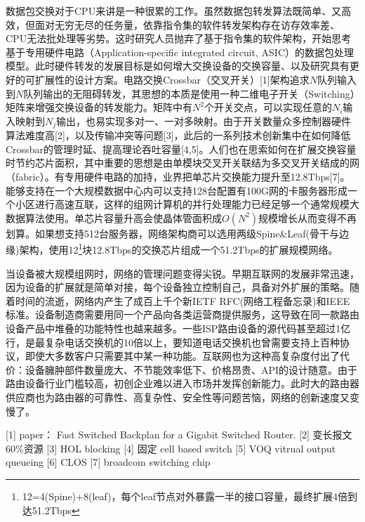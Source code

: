 
数据包交换对于CPU来讲是一种很累的工作。虽然数据包转发算法既简单、又高效，但面对无穷无尽的任务量，依靠指令集的软件转发架构存在访存效率差、CPU无法批处理等劣势。这时研究人员抛弃了基于指令集的软件架构，开始思考基于专用硬件电路（Application-specific integrated circuit, ASIC）的数据包处理模型。此时硬件转发的发展目标是如何增大交换设备的交换容量、以及研究具有更好的可扩展性的设计方案。电路交换Crossbar（交叉开关）[1]架构追求$N$队列输入到$N$队列输出的无阻碍转发，其思想的本质是使用一种二维电子开关（Switching）矩阵来增强交换设备的转发能力。矩阵中有$N^2$个开关交点，可以实现任意的$N_i$输入映射到$N_j$输出，也易实现多对一、一对多映射。由于开关数量众多控制器硬件算法难度高[2]，以及传输冲突等问题[3]，此后的一系列技术创新集中在如何降低Crossbar的管理时延、提高理论吞吐容量[4,5]。人们也在思索如何在扩展交换容量时节约芯片面积，其中重要的思想是由单模块交叉开关联结为多交叉开关结成的网（fabric）。有专用硬件电路的加持，业界把单芯片交换能力提升至12.8Tbps[7]。能够支持在一个大规模数据中心内可以支持128台配置有100G网的卡服务器形成一个小区进行高速互联，这样的组网计算机的并行处理能力已经足够一个通常规模大数据算法使用。单芯片容量升高会使晶体管面积成$O(N^2)$规模增长从而变得不再划算。如果想支持512台服务器，网络架构商可以选用两级Spine\&Leaf(骨干与边缘)架构，使用12\footnote{12=4(Spine)+8(leaf)，每个leaf节点对外暴露一半的接口容量，最终扩展4倍到达51.2Tbps}块12.8Tbps的交换芯片组成一个51.2Tbps的扩展规模网络。

当设备被大规模组网时，网络的管理问题变得尖锐。早期互联网的发展非常迅速，因为设备的扩展就是简单对接，每个设备独立控制自己，具备对外扩展的策略。随着时间的流逝，网络内产生了成百上千个新IETF RFC(网络工程备忘录)和IEEE标准。设备制造商需要用同一个产品向各类运营商提供服务，这导致在同一款路由设备产品中堆叠的功能特性也越来越多。一些ISP路由设备的源代码甚至超过1亿行，是最复杂电话交换机的10倍以上，要知道电话交换机也曾需要支持上百种协议，即使大多数客户只需要其中某一种功能。互联网也为这种高复杂度付出了代价：设备臃肿部件数量庞大、不节能效率低下、价格昂贵、API的设计随意。由于路由设备行业门槛较高，初创企业难以进入市场并发挥创新能力。此时大的路由器供应商也为路由器的可靠性、高复杂性、安全性等问题苦恼，网络的创新速度又变慢了。




[1] paper： Fast Switched Backplan for a Gigabit Switched Router.
[2] 变长报文 60\%资源
[3] HOL blocking
[4] 固定 cell based switch 
[5] VOQ vitrual output queueing
[6] CLOS
[7] broadcom switching chip

